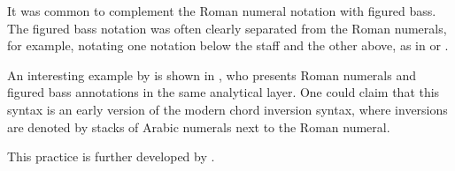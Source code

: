 
It was common to complement the Roman numeral notation with
figured bass. The figured bass notation was often clearly
separated from the Roman numerals, for example, notating one
notation below the staff and the other above, as in
 or
.

An interesting example by \textcite{bussler1878praktische}
is shown in
, who
presents Roman numerals and figured bass annotations in the
same analytical layer. One could claim that this syntax is
an early version of the modern chord inversion syntax, where
inversions are denoted by stacks of Arabic numerals next to
the Roman numeral.


This practice is further developed by
\textcite{emery1879elements}. 

